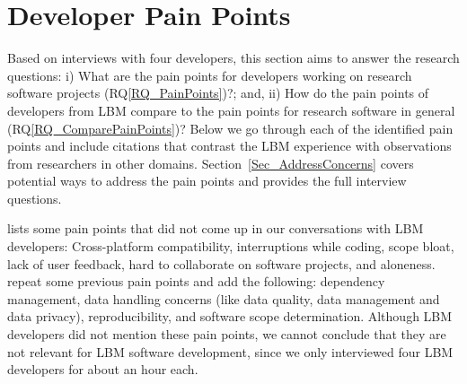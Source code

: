\documentclass[final, 3p, times, authoryear]{elsarticle}
\newcommand{\rqref}[1]{RQ\ref{#1}}
\begin{document}
\section{Developer Pain Points} \label{painpoints}

Based on interviews with four developers, this section aims to answer the
research questions: i) What are the pain points for developers working on
research software projects (\rqref{RQ_PainPoints})?; and, ii) How do the pain
points of developers from LBM compare to the pain points for research software
in general (\rqref{RQ_ComparePainPoints})?  Below we go through each of the
identified pain points and include citations that contrast the LBM experience
with observations from researchers in other domains.
Section~\ref{Sec_AddressConcerns} covers potential ways to address the pain
points and \citet{SmithEtAl2021} provides the full interview questions.

\citet{PintoEtAl2018} lists some pain points that did not come up in our
conversations with LBM developers: Cross-platform compatibility, interruptions
while coding, scope bloat, lack of user feedback, hard to collaborate on
software projects, and aloneness. \citet{WieseEtAl2019} repeat some previous
pain points and add the following: dependency management, data handling concerns
(like data quality, data management and data privacy), reproducibility, and
software scope determination. Although LBM developers did not mention these pain
points, we cannot conclude that they are not relevant for LBM software
development, since we only interviewed four LBM developers for about an hour
each.
\end{document}
